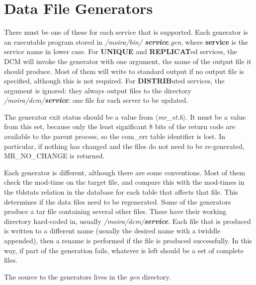 \documentclass{article}
\begin{document}
\section{Data File Generators}

There must be one of these for each service that is supported. Each
generator is an executable program stored in {\it /moira/bin/{\bf
service}.gen}, where {\bf service} is the service name in lower case.
For {\bf UNIQUE} and {\bf REPLICAT}ed services, the DCM will invoke
the generator with one argument, the name of the output file it should
produce. Most of them will write to standard output if no output file
is specified, although this is not required. For {\bf DISTRIB}uted
services, the argument is ignored: they always output files to the
directory {\it /moira/dcm/{\bf service}\/}: one file for each server
to be updated.

The generator exit status should be a value from {\em
$\langle$mr\_et.h$\rangle$}. It must be a value from this set, because
only the least significant 8 bits of the return code are available to
the parent process, so the com\_err table identifier is lost. In
particular, if nothing has changed and the files do not need to be
re-generated, MR\_NO\_CHANGE is returned.

Each generator is different, although there are some conventions.
Most of them check the mod-time on the target file, and compare this
with the mod-times in the tblstats relation in the database for each
table that affects that file.  This determines if the data files need
to be regenerated.  Some of the generators produce a tar file
containing several other files.  These have their working directory
hard-coded in, usually {\it /moira/dcm/{\bf service}}.  Each file that is
produced is written to a different name (usually the desired name with
a twiddle appended), then a rename is performed if the file is
produced successfully.  In this way, if part of the generation fails,
whatever is left should be a set of complete files.

The source to the generators lives in the {\it gen\/} directory.
\end{document}
